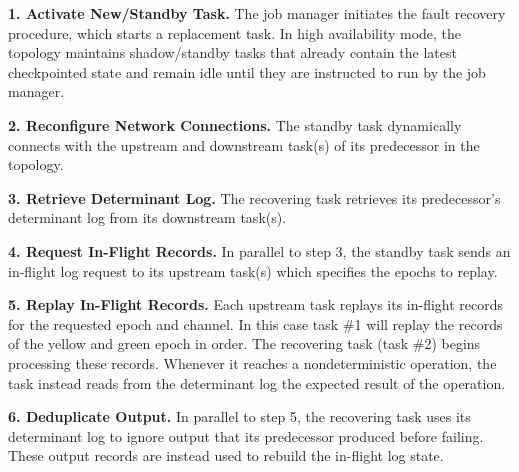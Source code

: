 \documentclass[sigconf]{acmart}
\newcommand{\para}[1]{\vspace{1mm}\noindent\textbf{#1.}}
\begin{document}

\para{1. Activate New/Standby Task}
The job manager initiates the fault recovery procedure, which starts a replacement task. In high availability mode, the topology maintains shadow/standby tasks that already contain the latest checkpointed state and remain idle until they are instructed to run by the job manager.

\para{2. Reconfigure Network Connections}
The standby task dynamically connects with the upstream and downstream task(s) of its predecessor in the topology.

\para{3. Retrieve Determinant Log}
The recovering task retrieves its predecessor's determinant log from its downstream task(s).

\para{4. Request In-Flight Records}
In parallel to step 3, the standby task sends an in-flight log request to its upstream task(s) which specifies the epochs to replay. 


\para{5. Replay In-Flight Records}
Each upstream task replays its in-flight records for the requested epoch and channel. In this case task \#1 will replay the records of the yellow and green epoch in order.
The recovering task (task \#2) begins processing these records. Whenever it reaches a nondeterministic operation, the task instead reads from the determinant log the expected result of the operation.

\para{6. Deduplicate Output}
In parallel to step 5, the recovering task uses its determinant log to ignore output that its predecessor produced before failing.
These output records are instead used to rebuild the in-flight log state.

\end{document}

